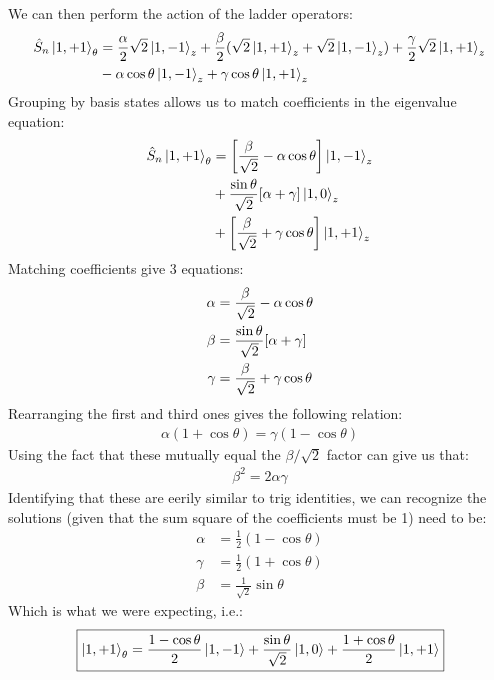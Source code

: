 \documentclass[12pt]{article}
\begin{document}
We can then perform the action of the ladder operators:
\begin{align*}
  \hat{S}_n\ket{1,+1}_\theta&=
  \frac\alpha2\sqrt{2}\ket{1,-1}_z
  +\frac\beta2(\sqrt{2}\ket{1,+1}_z+\sqrt{2}\ket{1,-1}_z)+
  \frac\gamma2\sqrt{2}\ket{1,+1}_z\\
  &-\alpha\cos\theta\ket{1,-1}_z+\gamma\cos\theta\ket{1,+1}_z
\end{align*}
Grouping by basis states allows us to match coefficients in the eigenvalue equation:
\begin{align*}
  \hat{S}_n\ket{1,+1}_\theta&=
  \qty[\frac\beta{\sqrt{2}}-\alpha\cos\theta]\ket{1,-1}_z\\
  &+\frac{\sin\theta}{\sqrt{2}}\qty[\alpha+\gamma]\ket{1,0}_z\\
  &+\qty[\frac\beta{\sqrt{2}}+\gamma\cos\theta]\ket{1,+1}_z
\end{align*}
Matching coefficients give 3 equations:
\begin{align*}
  \alpha&=\frac{\beta}{\sqrt{2}}-\alpha\cos\theta\\
  \beta&=\frac{\sin\theta}{\sqrt{2}}\qty[\alpha+\gamma]\\
  \gamma&=\frac{\beta}{\sqrt{2}}+\gamma\cos\theta
\end{align*}
Rearranging the first and third ones gives the following relation:
\begin{align*}
  \alpha(1+\cos\theta)=\gamma(1-\cos\theta)
\end{align*}
Using the fact that these mutually equal the $\beta/\sqrt{2}$ factor can give us that:
\begin{align*}
  \beta^2=2\alpha\gamma
\end{align*}
Identifying that these are eerily similar to trig identities, we can recognize the solutions (given that the sum square of the coefficients must be 1) need to be:
\begin{equation}
  \label{eq:p2a}
  \boxed{\begin{aligned}
      \alpha&=\frac12(1-\cos\theta)\\
      \gamma&=\frac12(1+\cos\theta)\\
      \beta&=\frac1{\sqrt{2}}\sin\theta
    \end{aligned}}
\end{equation}
Which is what we were expecting, i.e.:
\begin{equation}
  \label{eq:p2b}
  \boxed{\ket{1,+1}_\theta=
    \frac{1-\cos\theta}2\ket{1,-1}
    +\frac{\sin\theta}{\sqrt{2}}\ket{1,0}
    +\frac{1+\cos\theta}2\ket{1,+1}}
\end{equation}
\newpage
\end{document}
